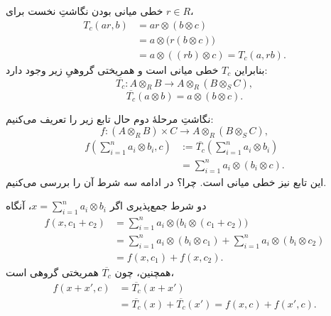 \begin{frame}[t]{خطی میانی بودن نگاشتِ نخست}
\label{lec20:fixed-c-balanced}
برای \(r\in R\)،
\[
\begin{aligned}
T_c(ar,b)
  &=ar\otimes(b\otimes c)\\
  &=a\otimes\bigl(r(b\otimes c)\bigr)\\
  &=a\otimes((rb)\otimes c)=T_c(a,rb).
\end{aligned}
\]
بنابراین \(T_c\) خطی میانی است و همریختی گروهیِ زیر وجود دارد:
\[
    \overline{T_c}:A\otimes_R B\longrightarrow A\otimes_R(B\otimes_S C),
\]
\[
    \overline{T_c}(a\otimes b)=a\otimes(b\otimes c).
\]
\end{frame}

\begin{frame}[t]{نگاشتِ مرحلهٔ دوم}
\label{lec20:associativity-second-map}
حال تابع زیر را تعریف می‌کنیم:
\[
    f:(A\otimes_R B)\times C\longrightarrow A\otimes_R(B\otimes_S C),
\]
\[
\begin{aligned}
f\left(\sum_{i=1}^n a_i\otimes b_i,c\right)
  &:=\overline{T_c}\left(\sum_{i=1}^n a_i\otimes b_i\right)\\
  &=\sum_{i=1}^n a_i\otimes(b_i\otimes c).
\end{aligned}
\]
این تابع نیز خطی میانی است. \alert{چرا؟}
در ادامه سه شرط آن را بررسی می‌کنیم.
\end{frame}

\begin{frame}[t]{دو شرط جمع‌پذیری}
\label{lec20:associativity-additivity}
اگر \(x=\sum_{i=1}^n a_i\otimes b_i\)، آنگاه
\[
\begin{aligned}
f(x,c_1+c_2)
 &=\sum_{i=1}^n a_i\otimes\bigl(b_i\otimes(c_1+c_2)\bigr)\\
 &=\sum_{i=1}^n a_i\otimes(b_i\otimes c_1)
   +\sum_{i=1}^n a_i\otimes(b_i\otimes c_2)\\
 &=f(x,c_1)+f(x,c_2).
\end{aligned}
\]
همچنین، چون \(\overline{T_c}\) همریختی گروهی است،
\[
\begin{aligned}
f(x+x',c)&=\overline{T_c}(x+x')\\
 &=\overline{T_c}(x)+\overline{T_c}(x')=f(x,c)+f(x',c).
\end{aligned}
\]
\end{frame}

